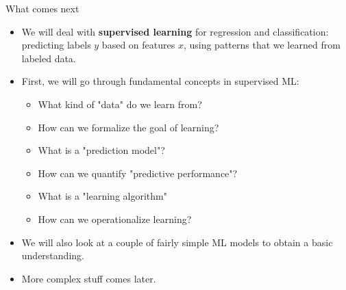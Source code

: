 


\begin{frame}{What comes next}

\begin{itemize}

\item We will deal with \textbf{supervised learning} for regression 
and classification: predicting labels $y$ based on features $x$, using 
patterns that we learned from labeled data.
  
  \item First, we will go through fundamental concepts in supervised ML: 
  \begin{itemize}
  
    \item What kind of "data" do we learn from?
    \item How can we formalize the goal of learning?
    \item What is a "prediction model"?
    \item How can we quantify "predictive performance"?
    \item What is a "learning algorithm" 
    \item How can we operationalize learning?
  
  \end{itemize}
  
  \item We will also look at a couple of fairly simple ML models to obtain a
  basic understanding.
  
  \item More complex stuff comes later.
  
\end{itemize}

\end{frame}



\endlecture

